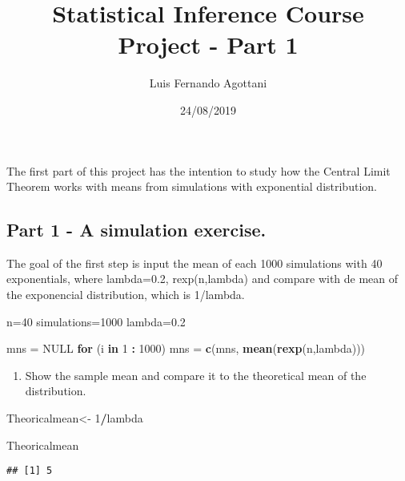 \documentclass[]{article}
\title{Statistical Inference Course Project - Part 1}
\author{Luis Fernando Agottani}
\date{24/08/2019}
\newenvironment{Shaded}{\begin{snugshade}}{\end{snugshade}}
\newcommand{\ControlFlowTok}[1]{\textcolor[rgb]{0.13,0.29,0.53}{\textbf{#1}}}
\newcommand{\DecValTok}[1]{\textcolor[rgb]{0.00,0.00,0.81}{#1}}
\newcommand{\FloatTok}[1]{\textcolor[rgb]{0.00,0.00,0.81}{#1}}
\newcommand{\KeywordTok}[1]{\textcolor[rgb]{0.13,0.29,0.53}{\textbf{#1}}}
\newcommand{\NormalTok}[1]{#1}
\newcommand{\OperatorTok}[1]{\textcolor[rgb]{0.81,0.36,0.00}{\textbf{#1}}}
\newcommand{\OtherTok}[1]{\textcolor[rgb]{0.56,0.35,0.01}{#1}}
\newcommand{\StringTok}[1]{\textcolor[rgb]{0.31,0.60,0.02}{#1}}
\providecommand{\tightlist}{%
  \setlength{\itemsep}{0pt}\setlength{\parskip}{0pt}}
\begin{document}
\maketitle

The first part of this project has the intention to study how the
Central Limit Theorem works with means from simulations with exponential
distribution.

\hypertarget{part-1---a-simulation-exercise.}{%
\subsection{Part 1 - A simulation
exercise.}\label{part-1---a-simulation-exercise.}}

The goal of the first step is input the mean of each 1000 simulations
with 40 exponentials, where lambda=0.2, rexp(n,lambda) and compare with
de mean of the exponencial distribution, which is 1/lambda.

\begin{Shaded}
\begin{Highlighting}[]
\NormalTok{n=}\DecValTok{40}
\NormalTok{simulations=}\DecValTok{1000}
\NormalTok{lambda=}\FloatTok{0.2}

\NormalTok{mns =}\StringTok{ }\OtherTok{NULL}
\ControlFlowTok{for}\NormalTok{ (i }\ControlFlowTok{in} \DecValTok{1} \OperatorTok{:}\StringTok{ }\DecValTok{1000}\NormalTok{) mns =}\StringTok{ }\KeywordTok{c}\NormalTok{(mns,}
                            \KeywordTok{mean}\NormalTok{(}\KeywordTok{rexp}\NormalTok{(n,lambda)))}
\end{Highlighting}
\end{Shaded}

\begin{enumerate}
\def\labelenumi{\arabic{enumi}.}
\tightlist
\item
  Show the sample mean and compare it to the theoretical mean of the
  distribution.
\end{enumerate}

\begin{Shaded}
\begin{Highlighting}[]
\NormalTok{Theoricalmean<-}\StringTok{ }\DecValTok{1}\OperatorTok{/}\NormalTok{lambda}

\NormalTok{Theoricalmean}
\end{Highlighting}
\end{Shaded}

\begin{verbatim}
## [1] 5
\end{verbatim}
\end{document}
